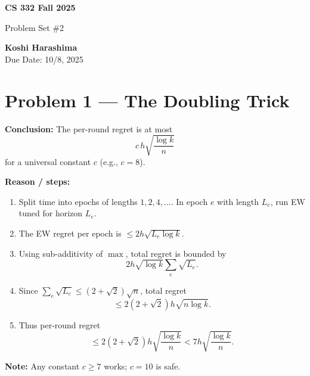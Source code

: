 \documentclass[11pt]{article}
\renewenvironment{shaded}{%
  \def\FrameCommand{\fboxsep=\FrameSep \colorbox{shadecolor}}%
  \MakeFramed{\advance\hsize-\width \FrameRestore\FrameRestore}}%
 {\endMakeFramed}
\begin{document}
\begin{titlepage}
   \begin{center}
       \vspace*{9cm}

       \textbf{CS 332 Fall 2025}

       \vspace{0.5cm}
        Problem Set \#2
        \vfill

       \textbf{Koshi Harashima}\\
       Due Date: 10/8, 2025
            
   \end{center}
\end{titlepage}

\pagebreak


\begin{shaded}
\section{Problem 1 --- The Doubling Trick}

\textbf{Conclusion:} The per-round regret is at most 
\[
c\,h\sqrt{\frac{\log k}{n}}
\]
for a universal constant \( c \) (e.g., \( c = 8 \)).

\textbf{Reason / steps:}
\begin{enumerate}
    \item Split time into epochs of lengths \( 1,2,4,\dots \). In epoch \( e \) with length \( L_e \), run EW tuned for horizon \( L_e \).
    \item The EW regret per epoch is \( \le 2h\sqrt{L_e\log k} \).
    \item Using sub-additivity of $\max$, total regret is bounded by 
    \[
    2h\sqrt{\log k}\sum_e \sqrt{L_e}.
    \]
    \item Since \( \sum_e \sqrt{L_e} \le (2+\sqrt{2})\sqrt{n} \), total regret 
    \[
    \le 2(2+\sqrt{2})h\sqrt{n\log k}.
    \]
    \item Thus per-round regret 
    \[
    \le 2(2+\sqrt{2})h\sqrt{\frac{\log k}{n}} < 7h\sqrt{\frac{\log k}{n}}.
    \]
\end{enumerate}

\textbf{Note:} Any constant \( c \ge 7 \) works; \( c=10 \) is safe.
\end{shaded}
\end{document}
